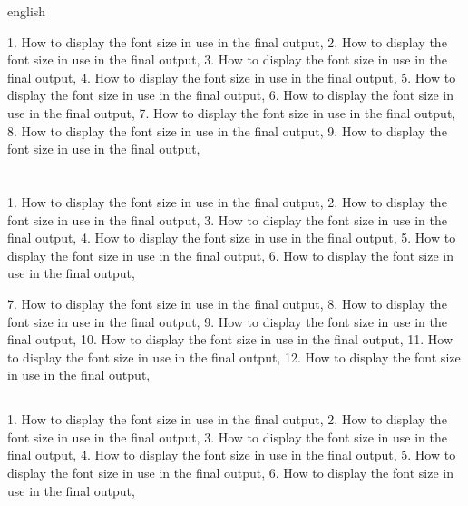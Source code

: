 \begin{otherlanguage*}{english}

\UFSCshowFont{}

1. How to display the font size in use in the final output,
2. How to display the font size in use in the final output,
3. How to display the font size in use in the final output,
4. How to display the font size in use in the final output,
5. How to display the font size in use in the final output,
6. How to display the font size in use in the final output,
7. How to display the font size in use in the final output,
8. How to display the font size in use in the final output,
9. How to display the font size in use in the final output,

%
\newpage

\section[Some encoding tests]{\UFSCshowFont}

1. How to display the font size in use in the final output,
2. How to display the font size in use in the final output,
3. How to display the font size in use in the final output,
4. How to display the font size in use in the final output,
5. How to display the font size in use in the final output,
6. How to display the font size in use in the final output,

7. How to display the font size in use in the final output,
8. How to display the font size in use in the final output,
9. How to display the font size in use in the final output,
10. How to display the font size in use in the final output,
11. How to display the font size in use in the final output,
12. How to display the font size in use in the final output,

\subsection{\UFSCshowFont}

1. How to display the font size in use in the final output,
2. How to display the font size in use in the final output,
3. How to display the font size in use in the final output,
4. How to display the font size in use in the final output,
5. How to display the font size in use in the final output,
6. How to display the font size in use in the final output,


\end{otherlanguage*}
